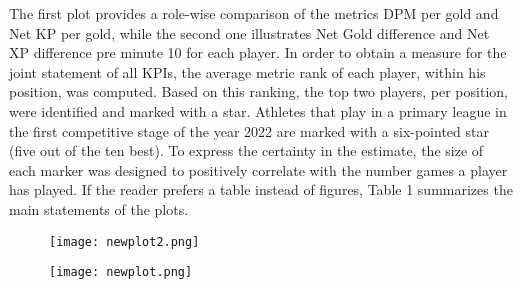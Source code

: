 \documentclass{article}
\begin{document}
The first plot provides a role-wise comparison of the metrics DPM per gold and Net KP per gold, while the second one illustrates Net Gold difference and Net XP difference pre minute 10 for each player. In order to obtain a measure for the joint statement of all KPIs, the average metric rank of each player, within his position, was computed. Based on this ranking, the top two players, per position, were identified and marked with a star. Athletes that play in a primary league in the first competitive stage of the year 2022 are marked with a six-pointed star (five out of the ten best). To express the certainty in the estimate, the size of each marker was designed to positively correlate with the number games a player has played. If the reader prefers a table instead of figures, Table 1 summarizes the main statements of the plots.
\begin{figure}[H]
\texttt{[image: newplot2.png]}

\end{figure}
\begin{figure}[H]
\texttt{[image: newplot.png]}

\end{figure}
\end{document}
